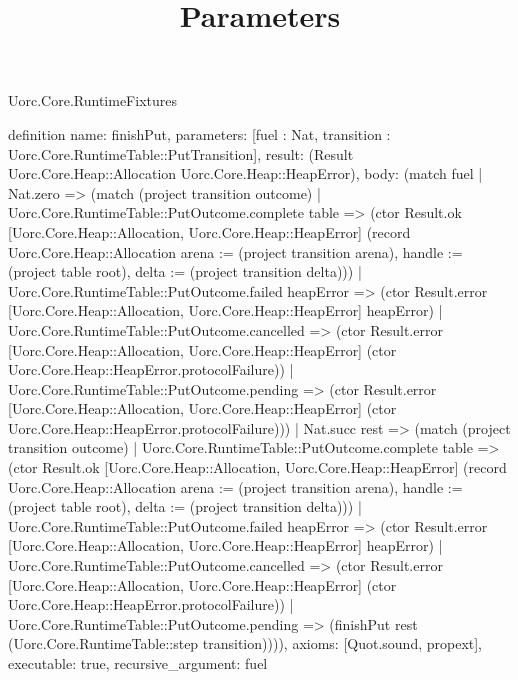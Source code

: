 \begin{lexlean}{Uorc.Core.RuntimeFixtures}
\title{Parameters}
\begin{semanticmodule}
definition{
  name: finishPut,
  parameters: [fuel : Nat, transition : Uorc.Core.RuntimeTable::PutTransition],
  result: (Result Uorc.Core.Heap::Allocation Uorc.Core.Heap::HeapError),
  body: (match fuel
    | Nat.zero => (match (project transition outcome)
      | Uorc.Core.RuntimeTable::PutOutcome.complete table => (ctor Result.ok [Uorc.Core.Heap::Allocation, Uorc.Core.Heap::HeapError] (record Uorc.Core.Heap::Allocation {arena := (project transition arena), handle := (project table root), delta := (project transition delta)}))
      | Uorc.Core.RuntimeTable::PutOutcome.failed heapError => (ctor Result.error [Uorc.Core.Heap::Allocation, Uorc.Core.Heap::HeapError] heapError)
      | Uorc.Core.RuntimeTable::PutOutcome.cancelled => (ctor Result.error [Uorc.Core.Heap::Allocation, Uorc.Core.Heap::HeapError] (ctor Uorc.Core.Heap::HeapError.protocolFailure))
      | Uorc.Core.RuntimeTable::PutOutcome.pending => (ctor Result.error [Uorc.Core.Heap::Allocation, Uorc.Core.Heap::HeapError] (ctor Uorc.Core.Heap::HeapError.protocolFailure)))
    | Nat.succ rest => (match (project transition outcome)
      | Uorc.Core.RuntimeTable::PutOutcome.complete table => (ctor Result.ok [Uorc.Core.Heap::Allocation, Uorc.Core.Heap::HeapError] (record Uorc.Core.Heap::Allocation {arena := (project transition arena), handle := (project table root), delta := (project transition delta)}))
      | Uorc.Core.RuntimeTable::PutOutcome.failed heapError => (ctor Result.error [Uorc.Core.Heap::Allocation, Uorc.Core.Heap::HeapError] heapError)
      | Uorc.Core.RuntimeTable::PutOutcome.cancelled => (ctor Result.error [Uorc.Core.Heap::Allocation, Uorc.Core.Heap::HeapError] (ctor Uorc.Core.Heap::HeapError.protocolFailure))
      | Uorc.Core.RuntimeTable::PutOutcome.pending => (finishPut rest (Uorc.Core.RuntimeTable::step transition)))),
  axioms: [Quot.sound, propext],
  executable: true,
  recursive_argument: fuel
}


\end{semanticmodule}
\end{lexlean}
